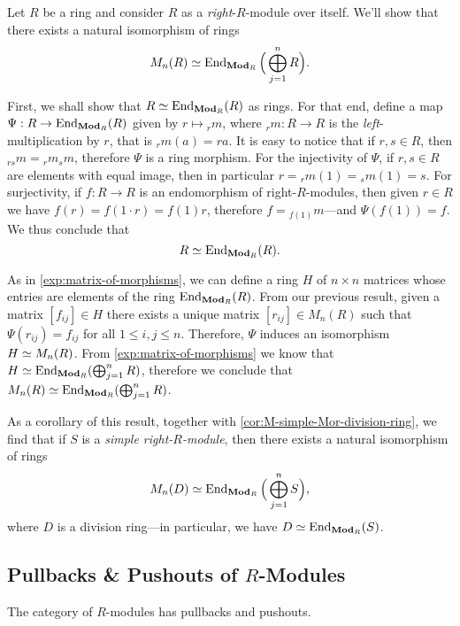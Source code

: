 \begin{example}
\label{exp:matrix-of-morphisms-over-ring}
Let \(R\) be a ring and consider \(R\) as a \emph{right}-\(R\)-module over
itself. We'll show that there exists a natural isomorphism of rings
\[
M_n(R) \simeq \operatorname{End}_{{\textbf{Mod}_{R}}}\Big( \bigoplus_{j=1}^n R \Big).
\]

First, we shall show that \(R \simeq \operatorname{End}_{{\textbf{Mod}_{R}}}(R)\) as rings. For that end,
define a map \(\Psi: R \to \operatorname{End}_{{\textbf{Mod}_{R}}}(R)\) given by \(r \mapsto {}_rm\),
where \({}_rm: R \to R\) is the \emph{left}-multiplication by \(r\), that is
\({}_rm(a) = r a\). It is easy to notice that if \(r, s \in R\), then
\({}_{r s}m = {}_rm {}_sm\), therefore \(\Psi\) is a ring morphism. For the
injectivity of \(\Psi\), if \(r, s \in R\) are elements with equal image, then
in particular \(r = {}_rm(1) = {}_sm(1) = s\). For surjectivity, if
\(f: R \to R\) is an endomorphism of right-\(R\)-modules, then given \(r \in R\)
we have \(f(r) = f(1 \cdot r) = f(1) r\), therefore \(f = {}_{f(1)}m\)---and
\(\Psi(f(1)) = f\). We thus conclude that
\[
R \simeq \operatorname{End}_{{\textbf{Mod}_{R}}}(R).
\]

As in \cref{exp:matrix-of-morphisms}, we can define a ring \(H\) of
\(n \times n\) matrices whose entries are elements of the ring
\(\operatorname{End}_{{\textbf{Mod}_{R}}}(R)\). From our previous result, given a matrix
\([f_{ij}] \in H\) there exists a unique matrix \([r_{ij}] \in M_n(R)\) such
that \(\Psi(r_{ij}) = f_{ij}\) for all \(1 \leq i, j \leq n\). Therefore,
\(\Psi\) induces an isomorphism \(H \simeq M_n(R)\). From
\cref{exp:matrix-of-morphisms} we know that
\(H \simeq \operatorname{End}_{{\textbf{Mod}_{R}}}(\bigoplus_{j=1}^n R)\), therefore we conclude that
\(M_n(R) \simeq \operatorname{End}_{{\textbf{Mod}_{R}}}(\bigoplus_{j=1}^n R)\).

As a corollary of this result, together with
\cref{cor:M-simple-Mor-division-ring}, we find that if \(S\) is a \emph{simple
  right-\(R\)-module}, then there exists a natural isomorphism of rings
\[
M_n(D) \simeq \operatorname{End}_{{\textbf{Mod}_{R}}}\Big(\bigoplus_{j=1}^n S \Big),
\]
where \(D\) is a division ring---in particular, we have
\(D \simeq \operatorname{End}_{{\textbf{Mod}_{R}}}(S)\).
\end{example}

\subsection{Pullbacks \& Pushouts of \texorpdfstring{\(R\)}{R}-Modules}

\begin{theorem}
\label{thm:R-mod-pullback-pushouts}
The category of \(R\)-modules has pullbacks and pushouts.
\end{theorem}

